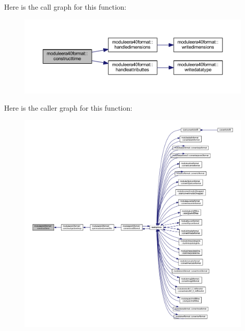 Here is the call graph for this function\+:\nopagebreak
\begin{figure}[H]
\begin{center}
\leavevmode
\includegraphics[width=350pt]{namespacemoduleera40format_a866d19867c0e3bcef28981a8907ea516_cgraph}
\end{center}
\end{figure}
Here is the caller graph for this function\+:\nopagebreak
\begin{figure}[H]
\begin{center}
\leavevmode
\includegraphics[width=350pt]{namespacemoduleera40format_a866d19867c0e3bcef28981a8907ea516_icgraph}
\end{center}
\end{figure}
\mbox{\label{namespacemoduleera40format_a0ebf94dc06f2741d57181016580896b9}} 

